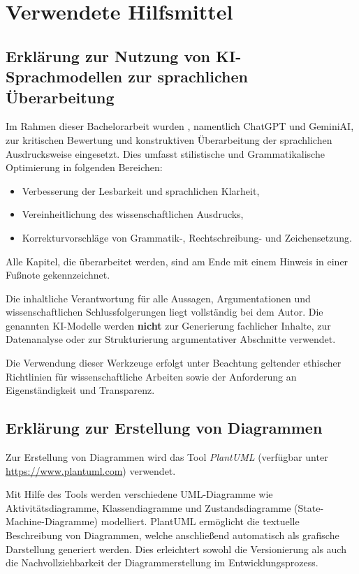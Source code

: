 
\section{Verwendete Hilfsmittel}

\subsection{Erkl\"arung zur Nutzung von KI-Sprachmodellen zur sprachlichen \"Uberarbeitung}
Im Rahmen dieser Bachelorarbeit wurden , namentlich ChatGPT und GeminiAI, zur kritischen Bewertung und konstruktiven \"Uberarbeitung der sprachlichen Ausdrucksweise eingesetzt. Dies umfasst stilistische und Grammatikalische Optimierung in folgenden Bereichen:

\begin{itemize}
	\item Verbesserung der Lesbarkeit und sprachlichen Klarheit,
	\item Vereinheitlichung des wissenschaftlichen Ausdrucks,
	\item Korrekturvorschl\"age von Grammatik-, Rechtschreibung- und Zeichensetzung.
\end{itemize}

Alle Kapitel, die \"uberarbeitet werden, sind am Ende mit einem Hinweis in einer Fu{\ss}note gekennzeichnet.

Die inhaltliche Verantwortung f\"ur alle Aussagen, Argumentationen und wissenschaftlichen Schlussfolgerungen liegt vollst\"andig bei dem Autor. Die genannten KI-Modelle werden \textbf{nicht} zur Generierung fachlicher Inhalte, zur Datenanalyse oder zur Strukturierung argumentativer Abschnitte verwendet.

Die Verwendung dieser Werkzeuge erfolgt unter Beachtung geltender ethischer Richtlinien f\"ur wissenschaftliche Arbeiten sowie der Anforderung an Eigenst\"andigkeit und Transparenz.

\newpage
\subsection{Erkl\"arung zur Erstellung von Diagrammen}

Zur Erstellung von Diagrammen wird das Tool \textit{PlantUML} (verf\"ugbar unter \url{https://www.plantuml.com}) verwendet. 

Mit Hilfe des Tools werden verschiedene UML-Diagramme wie Aktivit\"atsdiagramme, Klassendiagramme und Zustandsdiagramme (State-Machine-Diagramme) modelliert. PlantUML erm\"oglicht die textuelle Beschreibung von Diagrammen, welche anschlie{\ss}end automatisch als grafische Darstellung generiert werden. Dies erleichtert sowohl die Versionierung als auch die Nachvollziehbarkeit der Diagrammerstellung im Entwicklungsprozess.